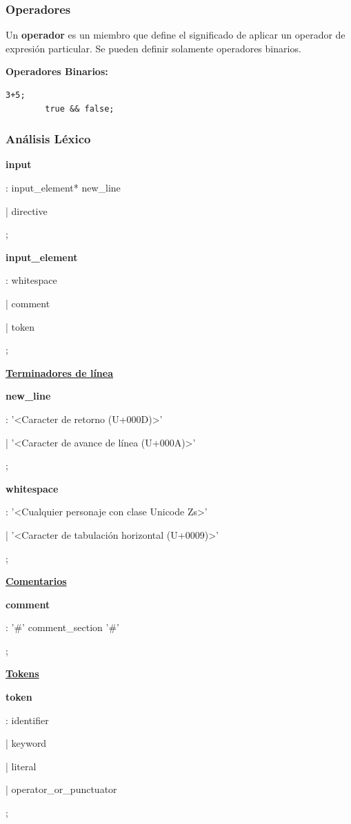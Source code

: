 \documentclass[12pt, letterpaper,spanish]{article}
\theoremstyle{definition}
\theoremstyle{remark}
\begin{document}
	\subsubsection{Operadores}
	Un \textbf{operador} es un miembro que define el significado de aplicar un operador de expresión particular. Se pueden definir solamente operadores binarios.\par
	
	\textbf{Operadores Binarios:}
	\begin{lstlisting}[language={PySharp}]
		3+5;
		true && false;
	\end{lstlisting}
	
	\subsubsection{Análisis Léxico}
	\textbf{input}\par
	: input\_element* new\_line\par
	| directive\par
	;\par
	
	\textbf{input\_element}\par
	: whitespace\par
	| comment\par
	| token\par
	;\par
	
	\underline{\textbf{Terminadores de línea}}\par
	\textbf{new\_line}\par
	: '<Caracter de retorno (U+000D)>'\par
	| '<Caracter de avance de línea (U+000A)>'\par
	;\par
	
	\textbf{whitespace}\par
	: '<Cualquier personaje con clase Unicode Zs>'\par
	| '<Caracter de tabulación horizontal (U+0009)>'\par
	;\par
	
	\underline{\textbf{Comentarios}}\par
	\textbf{comment}\par
	: '\#' comment\_section '\#'\par
	;\par
	
	\underline{\textbf{Tokens}}\par
	\textbf{token}\par
	: identifier\par
	| keyword\par
	| literal\par
	| operator\_or\_punctuator\par
	;\par
	
\end{document}
